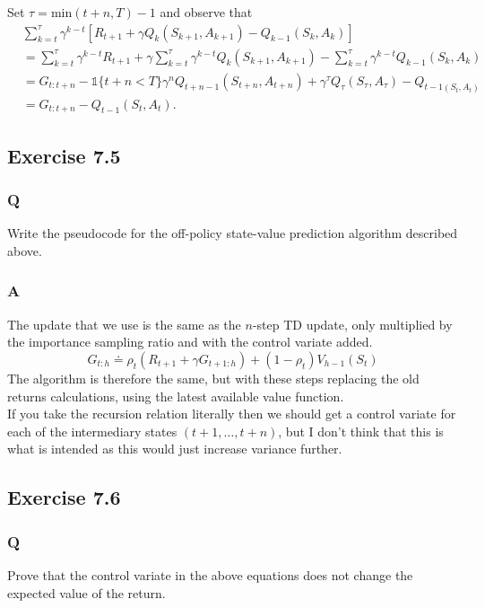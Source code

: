Set $\tau = \textrm{min}(t+n, T) - 1$ and observe that
\begin{align*}
   & \sum_{k=t}^{\tau} \gamma^{k-t} [R_{t+1} + \gamma Q_k(S_{k+1}, A_{k+1}) - Q_{k-1}(S_k, A_k)] \\
   &= \sum_{k=t}^{\tau} \gamma^{k-t} R_{t+1} + \gamma \sum_{k=t}^{\tau} \gamma^{k-t} Q_k(S_{k+1}, A_{k+1}) - \sum_{k=t}^{\tau} \gamma^{k-t} Q_{k-1}(S_k, A_k) \\
   &= G_{t:t+n} - \mathds{1}\{t+n < T\}\gamma^n Q_{t+n-1}(S_{t+n}, A_{t+n}) + \gamma^{\tau} Q_{\tau}(S_{\tau}, A_{\tau}) - Q_{t-1(S_t, A_t)} \\
   &= G_{t:t+n} - Q_{t-1}(S_t, A_t).
\end{align*}

\subsection{Exercise 7.5}
\subsubsection*{Q}
Write the pseudocode for the off-policy state-value prediction algorithm described above.
\subsubsection*{A}
The update that we use is the same as the $n$-step TD update, only multiplied by the importance sampling ratio and with the control variate added. 
\[
    G_{t:h} \doteq \rho_t (R_{t+1} + \gamma G_{t+1:h}) + (1 - \rho_t) V_{h-1}(S_t)
\]
The algorithm is therefore the same, but with these steps replacing the old returns calculations, using the latest available value function.\\

If you take the recursion relation literally then we should get a control variate for each of the intermediary states $(t+1, \dots, t+n)$, but I don't think that this is what is intended as this would just increase variance further.

\subsection{Exercise 7.6}
\subsubsection*{Q}
Prove that the control variate in the above equations does not change the expected value of the return.
